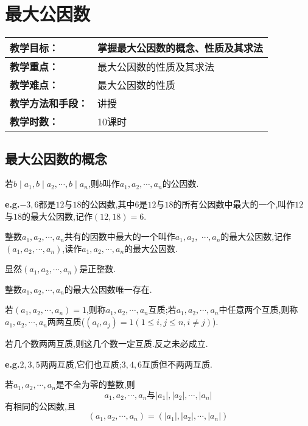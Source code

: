 \section{最大公因数}
\begin{table}[htb]
	\centering  
	\begin{tabular}{p{32mm}|p{95.6mm}}
		\hline 
		\textbf{教学目标：}       & 掌握最大公因数的概念、性质及其求法  \\ \hline
		\textbf{教学重点：}       & 最大公因数的性质及其求法 \\ \hline
		\textbf{教学难点：}       & 最大公因数的性质\\ \hline
		\textbf{教学方法和手段：} & 讲授  \\ \hline
		\textbf{教学时数：}       & 10课时 \\ \hline
	\end{tabular}
\end{table}
\subsection{最大公因数的概念}
 若$b\mid a_{1},b\mid a_{2},\cdots,b\mid a_{n}$,则$b$叫作$a_{1},a_{2},\cdots,a_{n}$的公因数.

\entry \textbf{e.g.}$-3,6$都是$12$与$18$的公因数,其中$6$是$12$与$18$的所有公因数中最大的一个,叫作$12$与$18$的最大公因数,记作$(12,18)=6$.

 整数$a_{1},a_{2},\cdots,a_{n}$共有的因数中最大的一个叫作$a_{1},a_{2},$ $\cdots,a_{n}$的最大公因数,记作$(a_{1},a_{2},\cdots,a_{n})$,读作$a_{1},a_{2},\cdots,a_{n}$的最大公因数.

显然$(a_{1},a_{2},\cdots,a_{n})$是正整数.

\theorem 整数$a_{1},a_{2},\cdots,a_{n}$的最大公因数唯一存在.

 若$(a_{1},a_{2},\cdots,a_{n})=1$,则称$a_{1},a_{2},\cdots,a_{n}$互质;若$a_{1},a_{2},\cdots,a_{n}$中任意两个互质,则称$a_{1},a_{2},\cdots,a_{n}$两两互质($(a_{i},a_{j})=1(1\leqslant i,j\leqslant n,i\neq j)$).

若几个数两两互质,则这几个数一定互质.反之未必成立.

\entry \textbf{e.g.}$2,3,5$两两互质,它们也互质;$3,4,6$互质但不两两互质.

\theorem 若$a_{1},a_{2},\cdots,a_{n}$是不全为零的整数,则
\begin{equation*}
	a_{1},a_{2},\cdots,a_{n}\text{与}|a_{1}|,|a_{2}|,\cdots,|a_{n}|
\end{equation*}
有相同的公因数,且
\begin{equation*}
	(a_{1},a_{2},\cdots,a_{n})=(|a_{1}|,|a_{2}|,\cdots,|a_{n}|)
\end{equation*}

